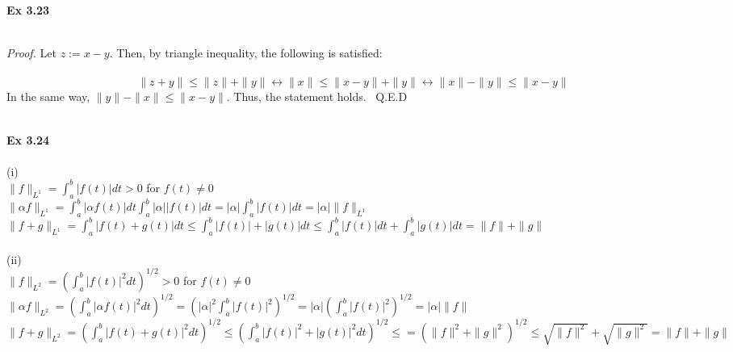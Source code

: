 \documentclass[letterpaper,12pt]{article}
\theoremstyle{definition}
\begin{document}
\begin{spacing}{1.3}{}
	\setlength{\leftskip}{10pt}
	
	\textbf{Ex 3.23} \\\\
	
	\setlength{\leftskip}{20pt}
	
	\emph{Proof.} Let $z := x-y$. Then, by triangle inequality, the following is satisfied: \\\\
	\[\|z+y\| \leq \|z\| + \|y\| \leftrightarrow \|x\| \leq \|x-y\| + \|y\| \leftrightarrow \|x\| - \|y\| \leq \|x-y\| \]
	In the same way, $\|y\| - \|x\| \leq \|x-y\|$. Thus, the statement holds. \ Q.E.D \\\\
	
	\setlength{\leftskip}{10pt}
	
	\textbf{Ex 3.24} \\\\
	
	\setlength{\leftskip}{20pt}
	(i) \\
	
	$\|f\|_{L^{1}} = \int_{a}^{b} |f(t)|dt >0$ for $f(t) \neq 0$ \\
	
	$\|\alpha f\|_{L^{1}} = \int_{a}^{b} |\alpha f(t)|dt \int_{a}^{b} |\alpha| |f(t)|dt = |\alpha| \int_{a}^{b} |f(t)|dt = |\alpha| \|f\|_{L^{1}}$ \\
	
	$\|f+g\|_{L^{1}} = \int_{a}^{b} |f(t)+g(t)|dt \leq \int_{a}^{b} |f(t)|+|g(t)|dt \leq \int_{a}^{b}|f(t)|dt + \int_{a}^{b}|g(t)|dt = \|f\| + \|g\| $ \\\\
	
	(ii) \\
	
	$\|f\|_{L^{2}} = (\int_{a}^{b} |f(t)|^{2}dt)^{1/2} >0$ for $f(t) \neq 0$ \\
	
	$\|\alpha f\|_{L^{2}} = (\int_{a}^{b} |\alpha f(t)|^{2}dt)^{1/2} = ( |\alpha|^2 \int_{a}^{b} |f(t)|^{2})^{1/2} = |\alpha|(\int_{a}^{b} |f(t)|^{2})^{1/2} = |\alpha| \|f\| $\\
	
	$\|f+g\|_{L^{2}} = (\int_{a}^{b} |f(t)+g(t)|^2 dt)^{1/2} \leq (\int_{a}^{b} |f(t)|^2+|g(t)|^2 dt)^{1/2} \leq = (\|f\|^2 + \|g\|^2)^{1/2} \leq \sqrt{\|f\|^2} + \sqrt{\|g\|^2} = \|f\|+\|g\|  $ \\\\
	

\end{spacing}
\end{document}
